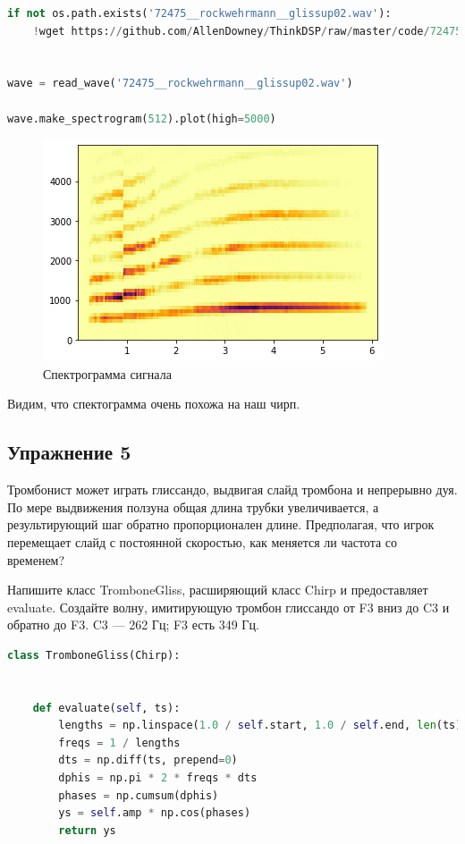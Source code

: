\begin{lstlisting}[language=Python]
if not os.path.exists('72475__rockwehrmann__glissup02.wav'):
    !wget https://github.com/AllenDowney/ThinkDSP/raw/master/code/72475__rockwehrmann__glissup02.wav
    

wave = read_wave('72475__rockwehrmann__glissup02.wav')

wave.make_spectrogram(512).plot(high=5000)
\end{lstlisting}
\begin{figure}[H]
	\begin{center}
		\includegraphics[scale=1]{fig/lab03/lab03_32_0.png}
		\caption{Спектрограмма сигнала}
	\end{center}
\end{figure}

Видим, что спектограмма очень похожа на наш чирп.

\subsection{Упражнение 5}

Тромбонист может играть глиссандо, выдвигая слайд тромбона и непрерывно дуя. По мере выдвижения ползуна общая длина трубки увеличивается, а результирующий шаг обратно пропорционален длине.
Предполагая, что игрок перемещает слайд с постоянной скоростью, как меняется ли частота со временем?

\noindent Напишите класс TromboneGliss, расширяющий класс Chirp и предоставляет evaluate. Создайте волну, имитирующую тромбон глиссандо от F3 вниз до C3 и обратно до F3. C3 — 262 Гц; F3 есть 349 Гц.

\begin{lstlisting}[language=Python]
class TromboneGliss(Chirp):

    
    def evaluate(self, ts):
        lengths = np.linspace(1.0 / self.start, 1.0 / self.end, len(ts))
        freqs = 1 / lengths
        dts = np.diff(ts, prepend=0)
        dphis = np.pi * 2 * freqs * dts
        phases = np.cumsum(dphis)
        ys = self.amp * np.cos(phases)
        return ys
\end{lstlisting}

